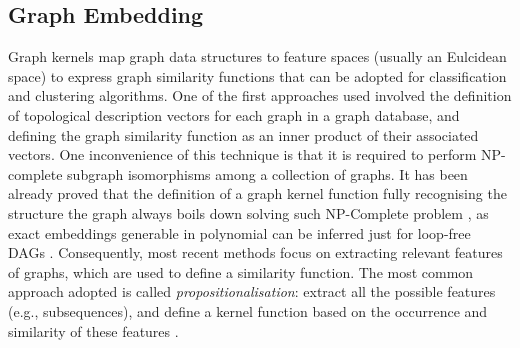 {\subsection{Graph Embedding}\label{ssec:ge}
Graph kernels map graph data structures to feature spaces (usually an Eulcidean space) to express graph similarity functions 
that can be adopted for classification \cite{TsudaS10} and clustering \cite{Raedt} algorithms. One of the first approaches used 
\cite{Sidere} involved the definition of topological description vectors for each graph in a graph database, and defining the graph 
similarity function as an inner product of their associated vectors. One inconvenience of this technique is that it is required to 
perform NP-complete subgraph isomorphisms among a collection of graphs. It has been already proved that the definition of a 
graph kernel function fully recognising the structure the graph always boils down solving such  NP-Complete problem 
\cite{GartnerFW03}, as exact embeddings generable in polynomial can be inferred just for loop-free DAGs \cite{BergamiBM20}.  
%
Consequently, most recent methods focus on extracting relevant features of graphs, which are used to define a similarity function. 
The most common approach adopted is called \textit{propositionalisation}: extract all the possible features (e.g., 
subsequences), and define a kernel function based on the occurrence and similarity of these features \cite{Gartner03}. 

}

